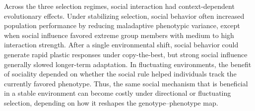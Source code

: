 \documentclass{article}
\begin{document}
Across the three selection regimes, social interaction had context-dependent evolutionary effects. Under stabilizing selection, social behavior often increased population performance by reducing maladaptive phenotypic variance, except when social influence favored extreme group members with medium to high interaction strength. After a single environmental shift, social behavior could generate rapid plastic responses under copy-the-best, but strong social influence generally slowed longer-term adaptation. In fluctuating environments, the benefit of sociality depended on whether the social rule helped individuals track the currently favored phenotype. Thus, the same social mechanism that is beneficial in a stable environment can become costly under directional or fluctuating selection, depending on how it reshapes the genotype–phenotype map.






\end{document}
